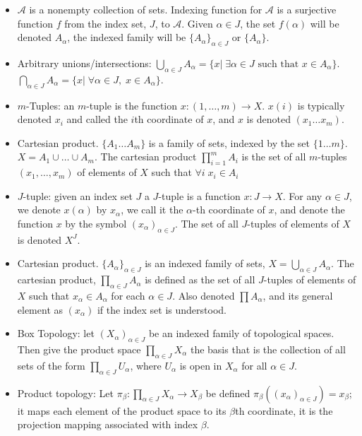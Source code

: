 \documentclass[12pt,letterpaper]{article}
\begin{document}
\begin{enumerate}
  \begin{itemize}
    \item $\mathcal{A}$ is a nonempty collection of sets. Indexing function for $\mathcal{A}$ is a surjective function $f$ from the index set, $J$, to $\mathcal{A}$. Given $\alpha \in J$, the set $f(\alpha)$ will be denoted $A_\alpha$, the indexed family will be $\{A_\alpha\}_{\alpha\in J}$ or $\{A_\alpha\}$.
    \item Arbitrary unions/intersections: $\displaystyle\bigcup_{\alpha\in J} A_\alpha = \{x |\; \exists \alpha \in J \text{ such that } x\in A_\alpha \}$. $\displaystyle\bigcap_{\alpha\in J} A_\alpha = \{x |\; \forall \alpha \in J,\; x\in A_\alpha \}$.
    \item $m$-Tuples: an $m$-tuple is the function $x: (1,\dots,m)\rightarrow X$. $x(i)$ is typically denoted $x_i$ and called the $i$th coordinate of $x$, and $x$ is denoted $(x_1\dots x_m)$.
    \item Cartesian product. $\{A_1\dots A_m\}$ is a family of sets, indexed by the set $\{1\dots m\}$. $X = A_1 \cup\dots \cup A_m$. The cartesian product $\displaystyle\prod_{i=1}^{m}A_i$ is the set of all $m$-tuples $(x_1,\dots ,x_m)$ of elements of $X$ such that $\forall i\; x_i \in A_i$
    \item $J$-tuple: given an index set $J$ a $J$-tuple is a function $x: J\rightarrow X$. For any $\alpha\in J$, we denote $x(\alpha)$ by $x_\alpha$, we call it the $\alpha$-th coordinate of $x$, and denote the function $x$ by the symbol $(x_\alpha)_{\alpha\in J}$. The set of all $J$-tuples of elements of $X$ is denoted $X^J$.
    \item Cartesian product. $\{A_\alpha\}_{\alpha\in J}$ is an indexed family of sets, $X=\bigcup_{\alpha\in J}A_\alpha$. The cartesian product, $\prod_{\alpha\in J} A_\alpha$ is defined as the set of all $J$-tuples of elements of $X$ such that $x_\alpha \in A_\alpha$ for each $\alpha\in J$. Also denoted $\prod A_\alpha$, and its general element as $(x_\alpha)$ if the index set is understood.
    \item Box Topology: let $(X_\alpha)_{\alpha\in J}$ be an indexed family of topological spaces. Then give the product space $\displaystyle\prod_{\alpha\in J}X_\alpha$ the basis that is the collection of all sets of the form $\displaystyle\prod_{\alpha\in J}U_\alpha$, where $U_\alpha$ is open in $X_\alpha$ for all $\alpha\in J$.
    \item Product topology: Let $\pi_\beta : \displaystyle\prod_{\alpha\in J}X_\alpha \rightarrow X_\beta$ be defined $\pi_\beta((x_\alpha)_{\alpha\in J}) = x_\beta$; it maps each element of the product space to its $\beta$th coordinate, it is the projection mapping associated with index $\beta$. \\

\end{itemize}
\end{enumerate}
\end{document}
